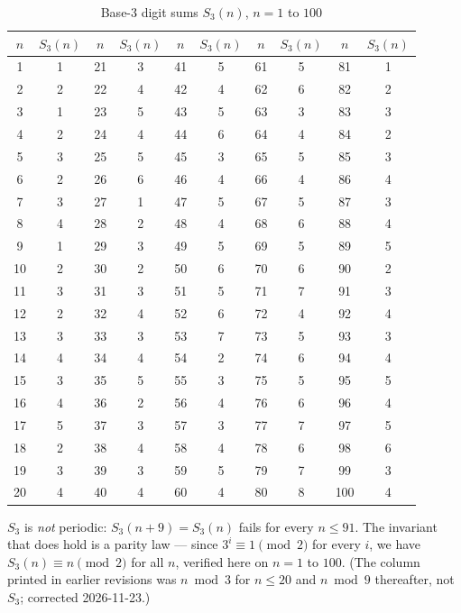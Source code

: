 \begin{table}[h]
\centering
\begin{tabular}{cccccccccc}
\hline
$n$ & $S_3(n)$ & $n$ & $S_3(n)$ & $n$ & $S_3(n)$ & $n$ & $S_3(n)$ & $n$ & $S_3(n)$ \\
\hline
1 & 1 & 21 & 3 & 41 & 5 & 61 & 5 & 81 & 1 \\
2 & 2 & 22 & 4 & 42 & 4 & 62 & 6 & 82 & 2 \\
3 & 1 & 23 & 5 & 43 & 5 & 63 & 3 & 83 & 3 \\
4 & 2 & 24 & 4 & 44 & 6 & 64 & 4 & 84 & 2 \\
5 & 3 & 25 & 5 & 45 & 3 & 65 & 5 & 85 & 3 \\
6 & 2 & 26 & 6 & 46 & 4 & 66 & 4 & 86 & 4 \\
7 & 3 & 27 & 1 & 47 & 5 & 67 & 5 & 87 & 3 \\
8 & 4 & 28 & 2 & 48 & 4 & 68 & 6 & 88 & 4 \\
9 & 1 & 29 & 3 & 49 & 5 & 69 & 5 & 89 & 5 \\
10 & 2 & 30 & 2 & 50 & 6 & 70 & 6 & 90 & 2 \\
11 & 3 & 31 & 3 & 51 & 5 & 71 & 7 & 91 & 3 \\
12 & 2 & 32 & 4 & 52 & 6 & 72 & 4 & 92 & 4 \\
13 & 3 & 33 & 3 & 53 & 7 & 73 & 5 & 93 & 3 \\
14 & 4 & 34 & 4 & 54 & 2 & 74 & 6 & 94 & 4 \\
15 & 3 & 35 & 5 & 55 & 3 & 75 & 5 & 95 & 5 \\
16 & 4 & 36 & 2 & 56 & 4 & 76 & 6 & 96 & 4 \\
17 & 5 & 37 & 3 & 57 & 3 & 77 & 7 & 97 & 5 \\
18 & 2 & 38 & 4 & 58 & 4 & 78 & 6 & 98 & 6 \\
19 & 3 & 39 & 3 & 59 & 5 & 79 & 7 & 99 & 3 \\
20 & 4 & 40 & 4 & 60 & 4 & 80 & 8 & 100 & 4 \\
\hline
\end{tabular}
\caption{Base-3 digit sums $S_3(n)$, $n = 1$ to $100$}
\end{table}

$S_3$ is \emph{not} periodic: $S_3(n+9) = S_3(n)$ fails for every $n \le 91$. The invariant that does hold is a parity law --- since $3^i \equiv 1 \pmod 2$ for every $i$, we have $S_3(n) \equiv n \pmod 2$ for all $n$, verified here on $n = 1$ to $100$. (The column printed in earlier revisions was $n \bmod 3$ for $n \le 20$ and $n \bmod 9$ thereafter, not $S_3$; corrected 2026-11-23.)


